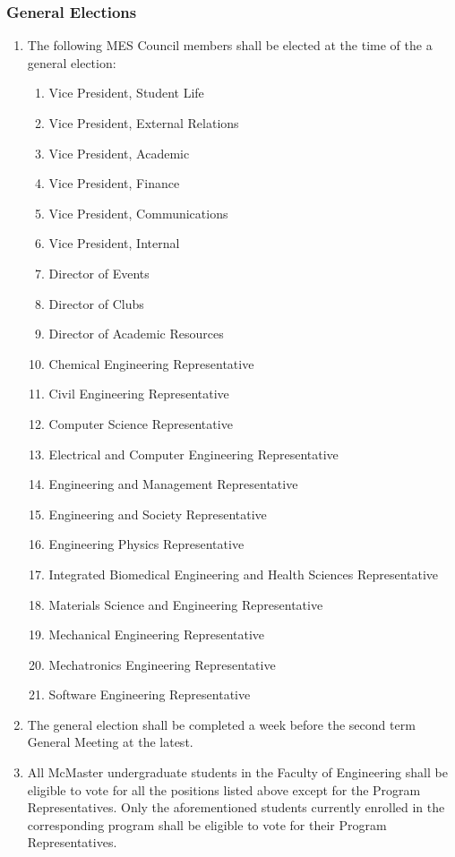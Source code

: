 \subsubsection{General Elections}
\label{general-elections}
\begin{enumerate}

 \item
  The following MES Council members shall be elected at the time of the a general election:

  \begin{enumerate}
   \item
    Vice President, Student Life
   \item
    Vice President, External Relations
   \item
    Vice President, Academic
   \item
    Vice President, Finance
   \item
    Vice President, Communications
   \item
    Vice President, Internal
   \item
    Director of Events
   \item
    Director of Clubs
   \item
    Director of Academic Resources
   \item
    Chemical Engineering Representative
   \item
    Civil Engineering Representative
   \item
    Computer Science Representative
   \item
    Electrical and Computer Engineering Representative
   \item
    Engineering and Management Representative
   \item
    Engineering and Society Representative
   \item
    Engineering Physics Representative
   \item
    Integrated Biomedical Engineering and Health Sciences Representative
   \item
    Materials Science and Engineering Representative
   \item
    Mechanical Engineering Representative
   \item
    Mechatronics Engineering Representative
   \item
    Software Engineering Representative
  \end{enumerate}
 \item
  The general election shall be completed a week before the second term General Meeting at the latest.
 \item
  All McMaster undergraduate students in the Faculty of Engineering shall be eligible to vote for all the positions listed above except for the Program Representatives. Only the aforementioned students currently enrolled in the corresponding program shall be eligible to vote for their Program Representatives.

\end{enumerate}

